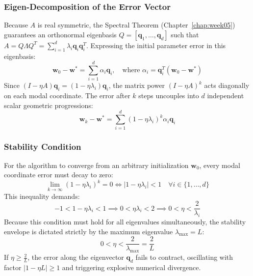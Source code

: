 \subsubsection{Eigen-Decomposition of the Error Vector}
Because $A$ is real symmetric, the Spectral Theorem (Chapter~\ref{chap:week05}) guarantees an orthonormal eigenbasis $Q = [\mathbf{q}_1, \dots, \mathbf{q}_d]$ such that $A = Q \Lambda Q^T = \sum_{i=1}^d \lambda_i \mathbf{q}_i \mathbf{q}_i^T$.
Expressing the initial parameter error in this eigenbasis:
\begin{equation}
\mathbf{w}_0 - \mathbf{w}^* = \sum_{i=1}^d \alpha_i \mathbf{q}_i, \quad \text{where } \alpha_i = \mathbf{q}_i^T (\mathbf{w}_0 - \mathbf{w}^*)
\end{equation}
Since $(I - \eta A) \mathbf{q}_i = (1 - \eta \lambda_i) \mathbf{q}_i$, the matrix power $(I - \eta A)^k$ acts diagonally on each modal coordinate. The error after $k$ steps uncouples into $d$ independent scalar geometric progressions:
\begin{equation}
\mathbf{w}_k - \mathbf{w}^* = \sum_{i=1}^d (1 - \eta \lambda_i)^k \alpha_i \mathbf{q}_i
\label{eq:decoupled_error}
\end{equation}

\subsubsection{Stability Condition}
For the algorithm to converge from an arbitrary initialization $\mathbf{w}_0$, every modal coordinate error must decay to zero:
\begin{equation}
\lim_{k \to \infty} (1 - \eta \lambda_i)^k = 0 \iff |1 - \eta \lambda_i| < 1 \quad \forall i \in \{1, \dots, d\}
\end{equation}
This inequality demands:
\begin{equation}
-1 < 1 - \eta \lambda_i < 1 \implies 0 < \eta \lambda_i < 2 \implies 0 < \eta < \frac{2}{\lambda_i}
\end{equation}
Because this condition must hold for all eigenvalues simultaneously, the stability envelope is dictated strictly by the maximum eigenvalue $\lambda_{\max} = L$:
\begin{equation}
0 < \eta < \frac{2}{\lambda_{\max}} = \frac{2}{L}
\label{eq:stability_threshold}
\end{equation}
If $\eta \ge \frac{2}{L}$, the error along the eigenvector $\mathbf{q}_d$ fails to contract, oscillating with factor $|1 - \eta L| \ge 1$ and triggering explosive numerical divergence.

